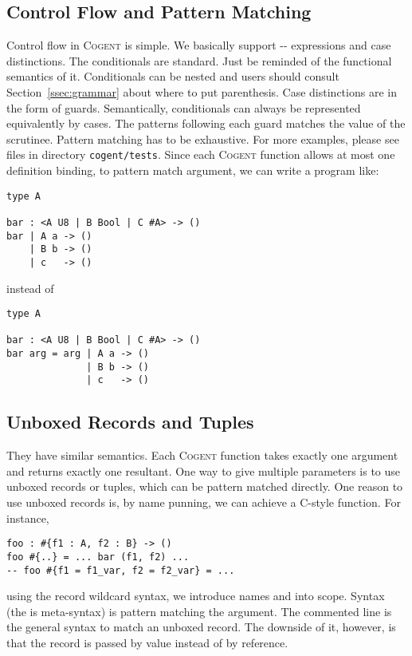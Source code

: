 \documentclass[a4paper]{article}
\newcommand{\cogent}{\textsc{Cogent}\xspace}
\begin{document}
\subsection{Control Flow and Pattern Matching}
Control flow in \cogent is simple. We basically support --
expressions and case distinctions. The conditionals are standard. Just be reminded of the
functional semantics of it. Conditionals can be nested and users should consult Section~\ref{ssec:grammar} about where to put parenthesis. Case distinctions are in the form
of guards. Semantically, conditionals can always be represented equivalently by cases.
The patterns following each guard matches the value of the scrutinee. Pattern matching has
to be exhaustive. For more examples, please see files in directory \texttt{cogent/tests}.
Since each \cogent function allows at most one definition binding, to pattern match argument, we can write
a program like:
\begin{lstlisting}[language=Cogent]
type A

bar : <A U8 | B Bool | C #A> -> ()
bar | A a -> ()
    | B b -> ()
    | c   -> ()
\end{lstlisting}
instead of
\begin{lstlisting}[language=Cogent]
type A

bar : <A U8 | B Bool | C #A> -> ()
bar arg = arg | A a -> ()
              | B b -> ()
              | c   -> ()
\end{lstlisting}


\subsection{Unboxed Records and Tuples} They have similar semantics.
Each \cogent function takes exactly one argument and returns exactly one resultant.
One way to give multiple parameters is to use unboxed records or tuples, which can be
pattern matched directly. One reason to use unboxed records is, by name punning,
we can achieve a C-style function. For instance,
\begin{lstlisting}[language=Cogent]
foo : #{f1 : A, f2 : B} -> ()
foo #{..} = ... bar (f1, f2) ...
-- foo #{f1 = f1_var, f2 = f2_var} = ...
\end{lstlisting}
using the record wildcard syntax, we introduce names  and 
into scope. Syntax  (the  is meta-syntax) is
pattern matching the argument. The commented line is the general syntax to match
an unboxed record. The downside of it, however, is that the record is passed by value
instead of by reference.
\end{document}
